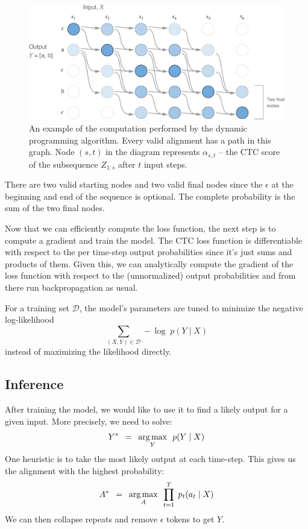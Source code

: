 \begin{figure}
\centering
    \includegraphics[width=\textwidth]{background/figures/ctc_cost.pdf}
\caption{An example of the computation performed by the dynamic programming
    algorithm. Every valid alignment has a path in this graph. Node $(s, t)$ in
    the diagram represents $\alpha_{s, t}$ – the CTC score of the subsequence
    $Z_{1:s}$ after $t$ input steps.}
\end{figure}

There are two valid starting nodes and two valid final nodes since the
$\epsilon$ at the beginning and end of the sequence is optional. The complete
probability is the sum of the two final nodes.

Now that we can efficiently compute the loss function, the next step is to
compute a gradient and train the model. The CTC loss function is differentiable
with respect to the per time-step output probabilities since it's just sums and
products of them. Given this, we can analytically compute the gradient of the
loss function with respect to the (unnormalized) output probabilities and from
there run backpropagation as usual.

For a training set $\mathcal{D}$, the model's parameters are tuned to minimize
the negative log-likelihood
\[
\sum_{(X, Y) \in \mathcal{D}} -\log\; p(Y \mid X)
\]
instead of maximizing the likelihood directly.

\subsection{Inference}

After training the model, we would like to use it to find a likely output for a
given input. More precisely, we need to solve:
\[
Y^* \enspace = \enspace \operatorname*{arg\,max}_Y \enspace p(Y \mid X)
\]
One heuristic is to take the most likely output at each time-step. This gives
us the alignment with the highest probability:
\[
A^* \enspace = \enspace \operatorname*{arg\,max}_A \enspace  \prod_{t=1}^{T} \; p_t(a_t \mid X)
\]
We can then collapse repeats and remove $\epsilon$ tokens to get $Y$.


